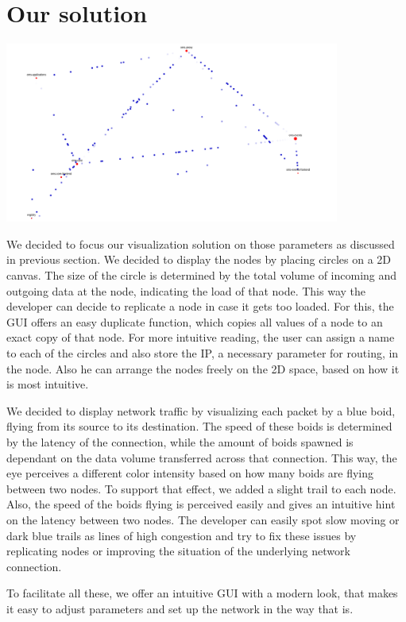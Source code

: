 \documentclass[]{paper}
\begin{document}
\section{Our solution}

\includegraphics[width=11cm]{screenshot.png}

We decided to focus our visualization solution on those parameters as discussed in previous section. We decided to display the nodes by placing circles on a 2D canvas. The size of the circle is determined by the total volume of incoming and outgoing data at the node, indicating the load of that node. This way the developer can decide to replicate a node in case it gets too loaded. For this, the GUI offers an easy duplicate function, which copies all values of a node to an exact copy of that node. For more intuitive reading, the user can assign a name to each of the circles and also store the IP, a necessary parameter for routing, in the node. Also he can arrange the nodes freely on the 2D space, based on how it is most intuitive.

We decided to display network traffic by visualizing each packet by a blue boid, flying from its source to its destination. The speed of these boids is determined by the latency of the connection, while the amount of boids spawned is dependant on the data volume transferred across that connection. This way, the eye perceives a different color intensity based on how many boids are flying between two nodes. To support that effect, we added a slight trail to each node. Also, the speed of the boids flying is perceived easily and gives an intuitive hint on the latency between two nodes. The developer can easily spot slow moving or dark blue trails as lines of high congestion and try to fix these issues by replicating nodes or improving the situation of the underlying network connection.

To facilitate all these, we offer an intuitive GUI with a modern look, that makes it easy to adjust parameters and set up the network in the way that is.
\end{document}
